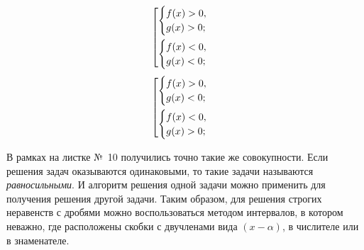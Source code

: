 \documentclass[algebra,twocolumn]{pum}
\newenvironment{sqcases}{%
  \left[
    \begin{gathered}
}{%
    \end{gathered}
  \right.
}
\begin{document}
\begin{tcbitemize}[raster columns=2,raster every box/.style={center title}]
  \label{tcb:systems}
  \tcbitem[squeezed title={$\frac{f(x)}{g(x)}>0$}]
  \vspace{-0.5cm}
  \begin{equation*}
      \begin{sqcases}
        \begin{cases}
          f(x)>0,\\ g(x)>0;
        \end{cases} \\
        \begin{cases}
          f(x)<0,\\ g(x)<0;
        \end{cases}
      \end{sqcases}
  \end{equation*}
  \tcbitem[squeezed title={$\frac{f(x)}{g(x)}<0$
}]
  \vspace{-0.5cm}
  \begin{equation*}
    \begin{sqcases}
      \begin{cases}
        f(x)>0,\\ g(x)<0;
      \end{cases} \\
      \begin{cases}
        f(x)<0,\\ g(x)>0;
      \end{cases}
    \end{sqcases}
  \end{equation*}
\end{tcbitemize}

В рамках на листке №~10 получились точно такие же совокупности. Если решения задач оказываются одинаковыми, то такие задачи называются \emph{равносильными}. И алгоритм решения одной задачи можно применить для получения решения другой задачи. Таким образом, для решения строгих неравенств с дробями можно воспользоваться методом интервалов, в котором неважно, где расположены скобки с двучленами вида $(x-\alpha)$, в числителе или в знаменателе.
\end{document}
